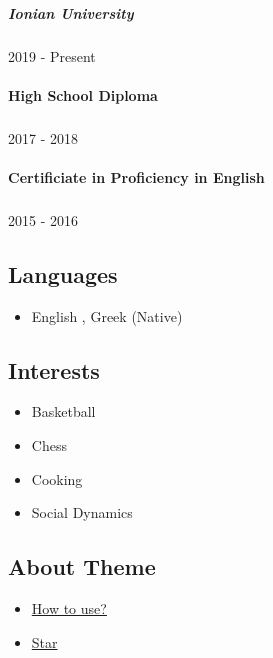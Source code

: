 \documentclass[english,]{article}
\providecommand{\tightlist}{%
  \setlength{\itemsep}{0pt}\setlength{\parskip}{0pt}}
\let\oldparagraph\paragraph
\renewcommand{\paragraph}[1]{\oldparagraph{#1}\mbox{}}
\let\oldsubparagraph\subparagraph
\renewcommand{\subparagraph}[1]{\oldsubparagraph{#1}\mbox{}}
\begin{document}
\hypertarget{ionian-university}{%
\subparagraph{Ionian University}\label{ionian-university}}

2019 - Present

\hypertarget{high-school-diploma}{%
\paragraph{High School Diploma}\label{high-school-diploma}}

\hypertarget{section}{%
\subparagraph{}\label{section}}

2017 - 2018

\hypertarget{certificiate-in-proficiency-in-english}{%
\paragraph{Certificiate in Proficiency in
English}\label{certificiate-in-proficiency-in-english}}

\hypertarget{section-1}{%
\subparagraph{}\label{section-1}}

2015 - 2016

\hypertarget{languages}{%
\subsection{Languages}\label{languages}}

\begin{itemize}
\tightlist
\item
  English , Greek {(Native)}
\end{itemize}

\hypertarget{interests}{%
\subsection{Interests}\label{interests}}

\begin{itemize}
\tightlist
\item
  Basketball
\item
  Chess
\item
  Cooking
\item
  Social Dynamics
\end{itemize}

\hypertarget{about-theme}{%
\subsection{About Theme}\label{about-theme}}

\begin{itemize}
\tightlist
\item
  \href{https://www.youtube.com/watch?v=Jnmj1dXDbNk}{How to use?}
\item
  \href{https://github.com/sharu725/online-cv}{Star}
\end{itemize}
\end{document}
